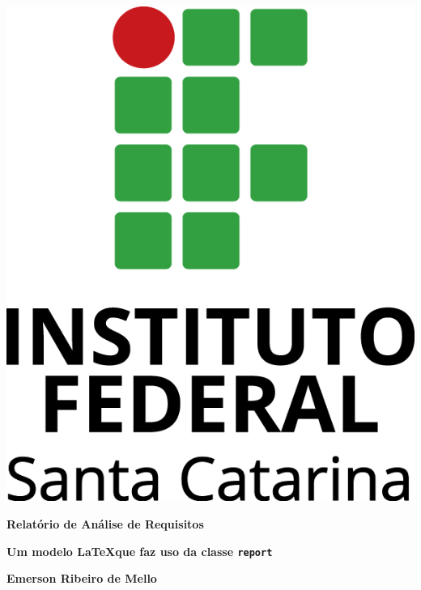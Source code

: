 \documentclass[11pt]{report}
\begin{document}

\pagestyle{empty}


\begin{center}

\includegraphics[scale=.7]{figuras/ifsc-logo-v}
\vspace{8cm}

{\huge \bfseries Relatório de Análise de Requisitos}

\vspace{.5cm}

{\large \bfseries Um modelo \LaTeX que faz uso da classe \texttt{report}}

\vfill

{\large \bfseries Emerson Ribeiro de Mello}

\end{center}
\end{document}
